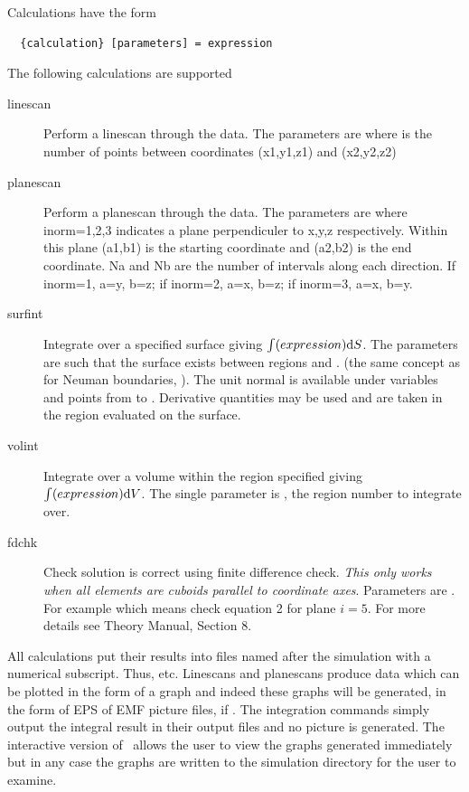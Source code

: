 \documentclass[a4paper,twoside,11pt]{book}
\begin{document}
Calculations have the form
\begin{verbatim}
  {calculation} [parameters] = expression
\end{verbatim}
The following calculations are supported
\begin{description}
  \item[linescan] Perform a linescan through the data. The parameters
    are  where  is the number
    of points between coordinates (x1,y1,z1) and (x2,y2,z2)
  \item[planescan] Perform a planescan through the data. The
    parameters are  where
    inorm=1,2,3 indicates a plane perpendiculer to x,y,z
    respectively. Within this plane (a1,b1) is the starting coordinate
    and (a2,b2) is the end coordinate. Na and Nb are the number of
    intervals along each direction. If inorm=1, a=y, b=z; if inorm=2,
    a=x, b=z; if inorm=3, a=x, b=y.
  \item[surfint] Integrate over a specified surface giving $\int
    (expression)\mathrm{d} S$. The parameters are  such that
    the surface exists between regions  and . (the
    same concept as for Neuman boundaries, ). The unit normal is
    available under variables  and points from
     to . Derivative quantities may be used and
    are taken in the  region evaluated on the surface.
  \item[volint] Integrate over a volume within the region specified
    giving $\int (expression)\mathrm{d} V$. The single parameter is
    , the region number to integrate over.
  \item[fdchk] Check solution is correct using finite difference
    check. \emph{This only works when all elements are cuboids
      parallel to coordinate axes}. Parameters are . For example  which means
    check equation 2 for plane $i=5$. For more details see Theory
    Manual, Section 8.
\end{description}

All calculations put their results into  files named after
the simulation with a numerical subscript. Thus,  etc. Linescans and planescans produce data which can be
plotted in the form of a graph and indeed these graphs will be
generated, in the form of EPS of EMF picture files, if
. The integration commands simply output the
integral result in their output files and no picture is generated. The
interactive version of \zpp\ allows the user to view the graphs
generated immediately but in any case the graphs are written to the
simulation directory for the user to examine.
\end{document}
